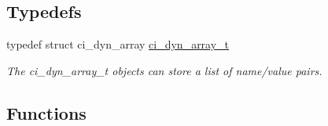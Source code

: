 \subsection*{Typedefs}
\begin{DoxyCompactItemize}
\item 
typedef struct ci\_\-dyn\_\-array \hyperlink{group__DYNAMIC__ARRAYS_ga26fd79bb931b37f9c02deca8da6fe638}{ci\_\-dyn\_\-array\_\-t}
\begin{DoxyCompactList}\small\item\em The ci\_\-dyn\_\-array\_\-t objects can store a list of name/value pairs. \item\end{DoxyCompactList}\end{DoxyCompactItemize}
\subsection*{Functions}
